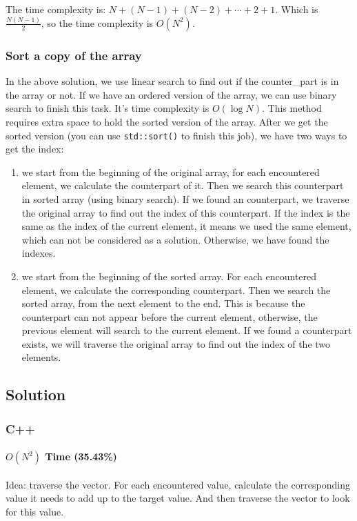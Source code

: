 \documentclass[12pt]{article}
\begin{document}
The time complexity is: \(N + (N - 1) + (N - 2) + \cdots + 2 + 1\). Which is \(\frac{N(N - 1)}{2}\), so the time complexity is \(O(N^2)\).
\subsubsection{Sort a copy of the array}
\label{sec:org62bac24}
In the above solution, we use linear search to find out if the counter\_part is in the array or not. If we have an ordered version of the array, we can use binary search to finish this task. It's time complexity is \(O(\log{N})\). This method requires extra space to hold the sorted version of the array. After we get the sorted version (you can use \texttt{std::sort()} to finish this job), we have two ways to get the index:
\begin{enumerate}
\item we start from the beginning of the original array, for each encountered element, we calculate the counterpart of it. Then we search this counterpart in sorted array (using binary search). If we found an counterpart, we traverse the original array to find out the index of this counterpart. If the index is the same as the index of the current element, it means we used the same element, which can not be considered as a solution. Otherwise, we have found the indexes.
\item we start from the beginning of the sorted array. For each encountered element, we calculate the corresponding counterpart. Then we search the sorted array, from the next element to the end. This is because the counterpart can not appear before the current element, otherwise, the previous element will search to the current element. If we found a counterpart exists, we will traverse the original array to find out the index of the two elements.
\end{enumerate}

\subsection{Solution}
\label{sec:org22aa725}
\subsubsection{C++}
\label{sec:orgcac4109}
\paragraph{\(O(N^2)\) Time (35.43\%)}
\label{sec:orgc7d943f}
Idea: traverse the vector. For each encountered value, calculate the corresponding value it needs to add up to the target value. And then traverse the vector to look for this value.
\end{document}
